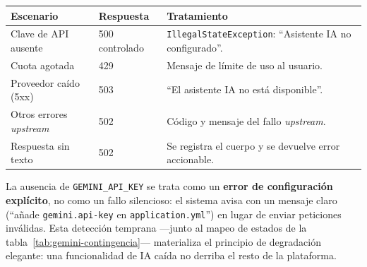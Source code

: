 \vspace{0.2cm}
\noindent
\renewcommand{\arraystretch}{1.3}
\fontsize{8.5}{10.2}\selectfont\sffamily
\begin{tabularx}{\textwidth}{|L{3.8cm}|C{1.8cm}|Y|}
\hline
{}
\sffamily\textbf{Escenario} & \sffamily\textbf{Respuesta} & \sffamily\textbf{Tratamiento} \\
\hline
Clave de API ausente & 500 controlado & \texttt{IllegalStateException}: ``Asistente IA no configurado''. \\ \hline
{}
Cuota agotada & 429 & Mensaje de límite de uso al usuario. \\ \hline
Proveedor caído (5xx) & 503 & ``El asistente IA no está disponible''. \\ \hline
{}
Otros errores \textit{upstream} & 502 & Código y mensaje del fallo \textit{upstream}. \\ \hline
Respuesta sin texto & 502 & Se registra el cuerpo y se devuelve error accionable. \\ \hline
\end{tabularx}
\label{tab:gemini-contingencia}

\begin{AlertaSeguridad}
La ausencia de \texttt{GEMINI\_API\_KEY} se trata como un \textbf{error de configuración
explícito}, no como un fallo silencioso: el sistema avisa con un mensaje claro
(``añade \texttt{gemini.api-key} en \texttt{application.yml}'') en lugar de enviar
peticiones inválidas. Esta detección temprana —junto al mapeo de estados de la
tabla~\ref{tab:gemini-contingencia}— materializa el principio de degradación elegante: una
funcionalidad de IA caída no derriba el resto de la plataforma.
\end{AlertaSeguridad}
